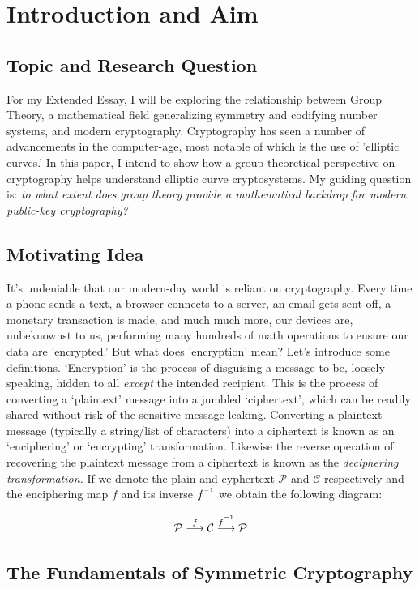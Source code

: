 \documentclass[11pt, a4paper]{report}
\newcommand{\inv}{^{\raisebox{.2em}{$\scriptscriptstyle-1$}}}
\begin{document}
\section{Introduction and Aim}
\subsection{Topic and Research Question}

For my Extended Essay, I will be exploring the relationship between Group Theory, a mathematical field generalizing symmetry and codifying number systems, and modern cryptography. Cryptography has seen a number of advancements in the computer-age, most notable of which is the use of 'elliptic curves.' In this paper, I intend to show how a group-theoretical perspective on cryptography helps understand elliptic curve cryptosystems. My guiding question is: \textit{to what extent does group theory provide a mathematical backdrop for modern public-key cryptography?}

\subsection{Motivating Idea}
It's undeniable that our modern-day world is reliant on cryptography. Every time a phone sends a text, a browser connects to a server, an email gets sent off, a monetary transaction is made, and much much more, our devices are, unbeknownst to us, performing many hundreds of math operations to ensure our data are 'encrypted.' But what does 'encryption' mean? Let's introduce some definitions. ‘Encryption’ is the process of disguising a message to be, loosely speaking, hidden to all \textit{except} the intended recipient. This is the process of converting a ‘plaintext’ message into a jumbled ‘ciphertext’, which can be readily shared without risk of the sensitive message leaking. Converting a plaintext message (typically a string/list of characters) into a ciphertext is known as an ‘enciphering’ or ‘encrypting’ transformation. Likewise the reverse operation of recovering the plaintext message from a ciphertext is known as the \textit{deciphering transformation.}\autocite[54]{koblitz} If we denote the plain and cyphertext $\mathcal{P}$ and $\mathcal{C}$ respectively and the enciphering map $f$ and its inverse $f\inv$ we obtain the following diagram:

$$ \mathcal{P} \overset{f}\longrightarrow \mathcal{C} \overset{f\inv}\longrightarrow \mathcal{P} $$

\subsection{The Fundamentals of Symmetric Cryptography}
\end{document}
